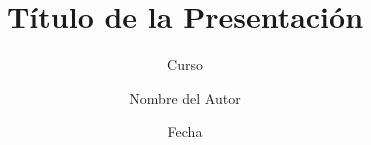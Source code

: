 \title{Título de la Presentación}
\subtitle{Curso}
\author{Nombre del Autor}
\date{Fecha}

\newcommand{\blocky}[2]{
    \begin{center}
        \begin{minipage}{0.8\textwidth}
            \begin{tcolorbox}[
                    colback=pink!5!white,
                    colframe=red!75!black,
                    title=\textbf{#1},
                    before title={\vspace{4pt}},
                    after title={\vspace{2pt}},
                    top=2mm,
                    bottom=2mm
                ]
                #2
            \end{tcolorbox}
        \end{minipage}
    \end{center}
}